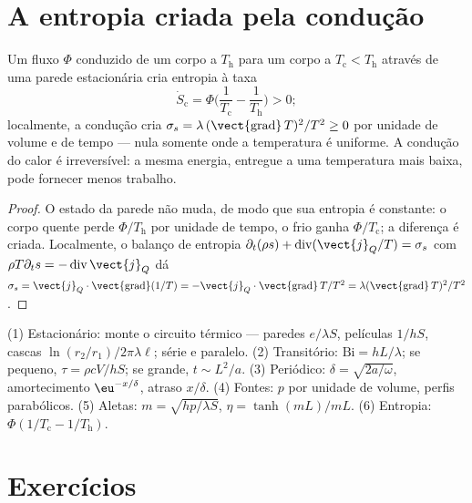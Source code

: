\section{A entropia criada pela condução}

\begin{proposition}\label{prop:b2:heat-conduction:entropy}
Um fluxo $\Phi$ conduzido de um corpo a $T_{\text{h}}$ para um corpo a
$T_{\text{c}} < T_{\text{h}}$ através de uma parede estacionária cria entropia à
taxa
\[
\dot S_{\text{c}} = \Phi\Big(\frac{1}{T_{\text{c}}} - \frac{1}{T_{\text{h}}}\Big) > 0 ;
\]
localmente, a condução cria $\sigma_s = \lambda\,(\vect{\operatorname{grad}}\,T)^2/T^2
\ge 0$ por unidade de volume e de tempo --- nula somente onde a temperatura é
uniforme. A condução do calor é irreversível: a mesma energia, entregue a
uma temperatura mais baixa, pode fornecer menos trabalho.
\end{proposition}

\begin{proof}
O estado da parede não muda, de modo que sua entropia é constante: o corpo
quente perde $\Phi/T_{\text{h}}$ por unidade de tempo, o frio ganha
$\Phi/T_{\text{c}}$; a diferença é criada. Localmente, o balanço de
entropia $\partial_t(\rho s) + \operatorname{div}(\vect{j}_Q/T) = \sigma_s$
com $\rho T\partial_t s = -\operatorname{div}\vect{j}_Q$ dá $\sigma_s =
\vect{j}_Q\cdot\vect{\operatorname{grad}}(1/T) = -\vect{j}_Q\cdot
\vect{\operatorname{grad}}\,T/T^2 = \lambda(\vect{\operatorname{grad}}\,T)^2/T^2$.
\end{proof}

\begin{method}\label{meth:b2:heat-conduction:method}
(1) Estacionário: monte o circuito térmico --- paredes $e/\lambda S$, películas
$1/hS$, cascas $\ln(r_2/r_1)/2\pi\lambda\ell$; série e paralelo.
(2) Transitório: $\mathrm{Bi} = hL/\lambda$; se pequeno, $\tau = \rho cV/hS$; se
grande, $t \sim L^2/a$. (3) Periódico: $\delta = \sqrt{2a/\omega}$, amortecimento
$\eu^{-x/\delta}$, atraso $x/\delta$. (4) Fontes: $p$ por unidade de volume, perfis
parabólicos. (5) Aletas: $m = \sqrt{hp/\lambda S}$, $\eta = \tanh(mL)/mL$. (6)
Entropia: $\Phi(1/T_{\text{c}} - 1/T_{\text{h}})$.
\end{method}

\section{Exercícios}

